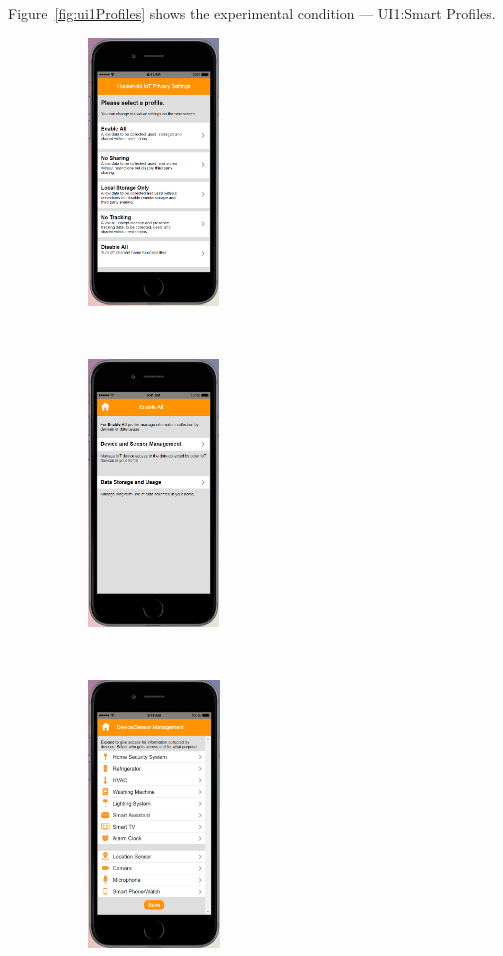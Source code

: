 \begin{appendices}
Figure~\ref{fig:ui1Profiles} shows the experimental condition --- UI1:Smart Profiles.
\begin{figure}[htb]
	\centering
	\begin{subfigure}[t]{0.2\textwidth}
		\centering
		\includegraphics[height=2.8in]{figures/ui1sp1.png}
	\end{subfigure}%
	~~~~~
	\begin{subfigure}[t]{0.2\textwidth}
		\centering
		\includegraphics[height=2.8in]{figures/ui1sp2.png}
	\end{subfigure}%
	~~~~~
	\begin{subfigure}[t]{0.2\textwidth}
		\centering
		\includegraphics[height=2.8in]{figures/ui1sp3.png}

\end{subfigure}
\end{figure}
\end{appendices}
